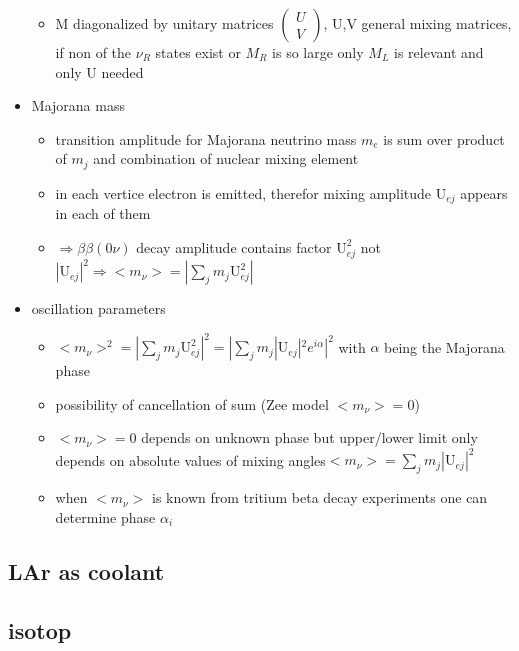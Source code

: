 \begin{itemize}
\begin{itemize}
\item M diagonalized by unitary matrices \(\begin{pmatrix} U \\ V \end{pmatrix}\), U,V general mixing matrices, if non of the \(\nu_R\) states exist or \(M_R\) is so large only \(M_L\) is relevant and only U needed
\end{itemize}
\item Majorana mass
\begin{itemize}
\item transition amplitude for Majorana neutrino mass \(m_e\) is sum over product of \(m_j\) and combination of nuclear mixing element
\item in each vertice electron is emitted, therefor mixing amplitude \(\mathrm{U}_{ej}\) appears in each of them
\item \(\Rightarrow \beta\beta(0\nu)\) decay amplitude contains factor \(\mathrm{U}_{ej}^2\) not \(|\mathrm{U}_{ej}|^2 \Rightarrow <m_\nu> = |\sum_jm_j\mathrm{U}_{ej}^2|\) 
\end{itemize}
\item oscillation parameters
\begin{itemize}
\item \(<m_\nu>^2 = |\sum_jm_j\mathrm{U}_{ej}^2|^2 = |\sum_jm_j|\mathrm{U}_{ej}|^2e^{i\alpha}|^2\) with \(\alpha\) being the Majorana phase
\item possibility of cancellation of sum (Zee model \(<m_\nu> = 0\))
\item \(<m_\nu> = 0\) depends on unknown phase but upper/lower limit only depends on absolute values of mixing angles\(<m_\nu> = \sum_jm_j|\mathrm{U}_{ej}|^2\)
\item when \(<m_\nu>\) is known from tritium beta decay experiments one can determine phase \(\alpha_i\)
\end{itemize}
\end{itemize}

 
\subsection{LAr as coolant} 
\label{sec:LArcoolant}


\subsection{ isotop}
\label{sec:Kry85}

